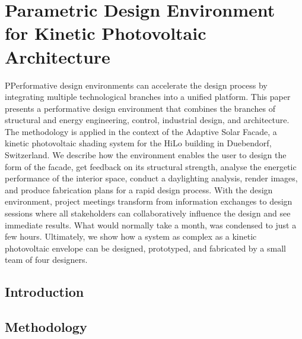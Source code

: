 
\chapter{Parametric Design Environment for Kinetic Photovoltaic Architecture}
\label{ch:asfDesign}


\begin{chapterabstract}
PPerformative design environments can accelerate the design process by integrating multiple technological branches into a unified platform. This paper presents a performative design environment that combines the branches of structural and energy engineering, control, industrial design, and architecture. The methodology is applied in the context of the Adaptive Solar Facade, a kinetic photovoltaic shading system for the HiLo building in Duebendorf, Switzerland. We describe how the environment enables the user to design the form of the facade, get feedback on its structural strength, analyse the energetic performance of the interior space, conduct a daylighting analysis, render images, and produce fabrication plans for a rapid design process. With the design environment, project meetings transform from information exchanges to design sessions where all stakeholders can collaboratively influence the design and see immediate results. What would normally take a month, was condensed to just a few hours. Ultimately, we show how a system as complex as a kinetic photovoltaic envelope can be designed, prototyped, and fabricated by a small team of four designers. 
\end{chapterabstract}


\newpage

\graphicspath{{chapters/ch1asfDesign//Images/}}

\section{Introduction}
\label{ch:introduction1}


\section{Methodology}
\label{ch:method1}



